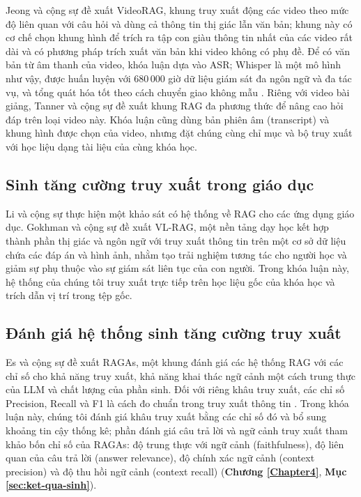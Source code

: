 Jeong và cộng sự \cite{jeong2025videorag} đề xuất VideoRAG, khung truy xuất động các video theo mức độ liên quan với câu hỏi và dùng cả thông tin thị giác lẫn văn bản; khung này có cơ chế chọn khung hình để trích ra tập con giàu thông tin nhất của các video rất dài và có phương pháp trích xuất văn bản khi video không có phụ đề. Để có văn bản từ âm thanh của video, khóa luận dựa vào ASR; Whisper là một mô hình như vậy, được huấn luyện với 680\,000 giờ dữ liệu giám sát đa ngôn ngữ và đa tác vụ, và tổng quát hóa tốt theo cách chuyển giao không mẫu \cite{radford2023whisper}. Riêng với video bài giảng, Tanner và cộng sự \cite{tanner2025lecture} đề xuất khung RAG đa phương thức để nâng cao hỏi đáp trên loại video này. Khóa luận cũng dùng bản phiên âm (transcript) và khung hình được chọn của video, nhưng đặt chúng cùng chỉ mục và bộ truy xuất với học liệu dạng tài liệu của cùng khóa học.

\subsection{Sinh tăng cường truy xuất trong giáo dục}

Li và cộng sự \cite{li2025ragedu} thực hiện một khảo sát có hệ thống về RAG cho các ứng dụng giáo dục. Gokhman và cộng sự \cite{gokhman2025vlrag} đề xuất VL-RAG, một nền tảng dạy học kết hợp thành phần thị giác và ngôn ngữ với truy xuất thông tin trên một cơ sở dữ liệu chứa các đáp án và hình ảnh, nhằm tạo trải nghiệm tương tác cho người học và giảm sự phụ thuộc vào sự giám sát liên tục của con người. Trong khóa luận này, hệ thống của chúng tôi truy xuất trực tiếp trên học liệu gốc của khóa học và trích dẫn vị trí trong tệp gốc.

\subsection{Đánh giá hệ thống sinh tăng cường truy xuất}

Es và cộng sự \cite{es2024ragas} đề xuất RAGAs, một khung đánh giá các hệ thống RAG với các chỉ số cho khả năng truy xuất, khả năng khai thác ngữ cảnh một cách trung thực của LLM và chất lượng của phần sinh. Đối với riêng khâu truy xuất, các chỉ số Precision, Recall và F1 là cách đo chuẩn trong truy xuất thông tin \cite{manning2008ir}. Trong khóa luận này, chúng tôi đánh giá khâu truy xuất bằng các chỉ số đó và bổ sung khoảng tin cậy thống kê; phần đánh giá câu trả lời và ngữ cảnh truy xuất tham khảo bốn chỉ số của RAGAs: độ trung thực với ngữ cảnh (faithfulness), độ liên quan của câu trả lời (answer relevance), độ chính xác ngữ cảnh (context precision) và độ thu hồi ngữ cảnh (context recall) (\textbf{Chương \ref{Chapter4}}, \textbf{Mục \ref{sec:ket-qua-sinh}}).

